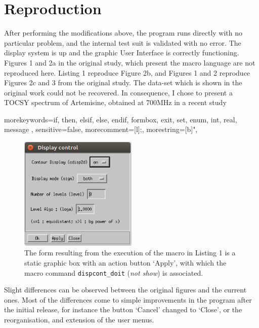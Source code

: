 \hypertarget{reproduction}{%
\section{Reproduction}\label{reproduction}}

After performing the modifications above, the program runs directly with
no particular problem, and the internal test suit is validated with no
error. The display system is up and the graphic User Interface is
correctly functioning. Figures 1 and 2a in the original study, which
present the macro language are not reproduced here. Listing 1 reproduce
Figure 2b, and Figures 1 and 2 reproduce Figures 2c and 3 from the
original study. The data-set which is shown in the original work could
not be recovered. In consequence, I chose to present a TOCSY spectrum of
Artemisine, obtained at 700MHz in a recent study \cite{Margueritte_2018}


    {morekeywords={if, then, elsif, else, endif, formbox, exit, set, enum, int, real, message },
    sensitive=false,
    morecomment=[l]{;},
    morestring=[b]",
    }

\lstset{ %
    basicstyle=\small,
    keywordstyle=\bfseries
    }


\begin{figure}
\centering
\includegraphics[width=0.5\textwidth]{figure2c.png}
\caption{The form resulting from the execution of the macro in Listing 1
is a static graphic box with an action button `Apply', with which the
macro command \texttt{dispcont\_doit} (\emph{not show}) is associated.}
\end{figure}

Slight differences can be observed between the original figures and the
current ones. Most of the differences come to simple improvements in the
program after the initial release, for instance the button `Cancel'
changed to `Close', or the reorganisation, and extension of the user
menus.

